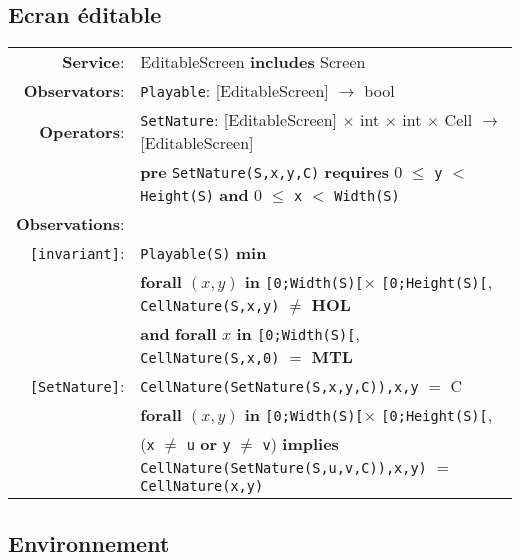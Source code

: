 \documentclass{article}
\begin{document}
\subsection*{Ecran éditable}

\begin{tabular}{rl}
\textbf{Service}: & \textrm{EditableScreen} {\bf includes} \textrm{Screen}  \\
\textbf{Observators}: & \texttt{Playable}: \textrm{[EditableScreen]} $\rightarrow$ \textrm{bool} \\
\textbf{Operators}: & \texttt{SetNature}: \textrm{[EditableScreen]} $\times$ \textrm{int} $\times$ \textrm{int} $\times$ \textrm{Cell}  $\rightarrow$ \textrm{[EditableScreen]} \\
& \quad \textbf{pre } \texttt{SetNature(S,x,y,C)} \textbf{ requires } 0 $\leq$ \texttt{y} $<$ \texttt{Height(S)} \textbf{ and } 0 $\leq$ \texttt{x} $<$ \texttt{Width(S)}\\
\textbf{Observations}: \\
\texttt{[invariant]}: & \texttt{Playable(S)} \textbf{min} \\
& \quad\quad\quad\quad \textbf{forall} $(x,y)$ \textbf{in} \texttt{[0;Width(S)[}$\times$ \texttt{[0;Height(S)[}, \texttt{CellNature(S,x,y)} $\neq$ \textbf{HOL}  \\
& \quad\quad\quad\quad \textbf{and} \textbf{forall} $x$ \textbf{in} \texttt{[0;Width(S)[}, \texttt{CellNature(S,x,0)} $=$ \textbf{MTL}  \\
\texttt{[SetNature]}: & \texttt{CellNature(SetNature(S,x,y,C)),x,y} $=$ C \\
        & \textbf{forall} $(x,y)$ \textbf{in} \texttt{[0;Width(S)[}$\times$ \texttt{[0;Height(S)[}, \\ & \quad\quad\quad\quad (\texttt{x} $\neq$ \texttt{u} \textbf{or} \texttt{y} $\neq$ \texttt{v}) \textbf{implies} \texttt{CellNature(SetNature(S,u,v,C)),x,y)} $=$ \texttt{CellNature(x,y)} \\
\end{tabular}


\subsection*{Environnement}
\end{document}
